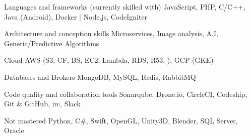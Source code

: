 

\begin{cvskills}

  \cvskill
    {Languages and frameworks (currently skilled with)} %
    {JavaScript, PHP, C/C++, Java (Android), Docker | Node.js, CodeIgniter} %

  \cvskill
    {Architecture and conception skills} %
    {Microservices, Image analysis, A.I, Generic/Predictive Algorithms} %

  \cvskill
    {Cloud} %
    {AWS (S3, CF, BS, EC2, Lambda, RDS, R53, ), GCP (GKE)} %

  \cvskill
    {Databases and Brokers} %
    {MongoDB, MySQL, Redis, RabbitMQ} %

  \cvskill
    {Code quality and collaboration tools} %
    {Sonarqube, Drone.io, CircleCI, Codeship, Git \& GitHub, irc, Slack} %

  \cvskill
    {Not mastered} %
    {Python, C\#, Swift, OpenGL, Unity3D, Blender, SQL Server, Oracle} %

\end{cvskills}
